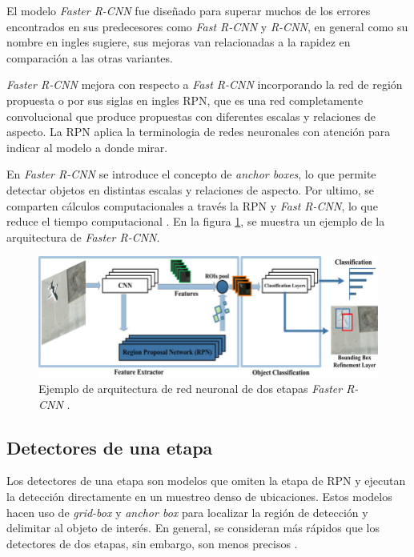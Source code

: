 El modelo \textit{Faster R-CNN} fue diseñado para superar muchos de los errores encontrados en sus predecesores como \textit{Fast R-CNN} y \textit{R-CNN}, en general como su nombre en ingles sugiere, sus mejoras van relacionadas a la rapidez en comparación a las otras variantes.

\textit{Faster R-CNN} mejora con respecto a \textit{Fast R-CNN} incorporando la red de región propuesta o por sus siglas en ingles RPN, que es una red completamente convolucional que produce propuestas con diferentes escalas y relaciones de aspecto. La RPN aplica la terminologia de redes neuronales con atención para indicar al modelo a donde mirar.

En \textit{Faster R-CNN} se introduce el concepto de \textit{anchor boxes}, lo que permite detectar objetos en distintas escalas y relaciones de aspecto. Por ultimo, se comparten cálculos computacionales a través la RPN y \textit{Fast R-CNN}, lo que reduce el tiempo computacional \cite{ARTICLE:9}. En la figura \ref{fig:Faster-rcnn}, se muestra un ejemplo de la arquitectura de \textit{Faster R-CNN}.

\begin{figure}[ht]
	\centering
	\includegraphics[scale=1.3]{./Figures/Faster-rcnn.png}
	\caption{Ejemplo de arquitectura de red neuronal de dos etapas \textit{Faster R-CNN} \cite{ARTICLE:11}.}
	\label{fig:Faster-rcnn}
\end{figure}

\subsection{Detectores de una etapa}

Los detectores de una etapa son modelos que omiten la etapa de RPN y ejecutan la detección directamente en un muestreo denso de ubicaciones. Estos modelos hacen uso de \textit{grid-box} y \textit{anchor box} para localizar la región de detección y delimitar al objeto de interés. En general, se consideran más rápidos que los detectores de dos etapas, sin embargo, son menos precisos \cite{ARTICLE:12}.

